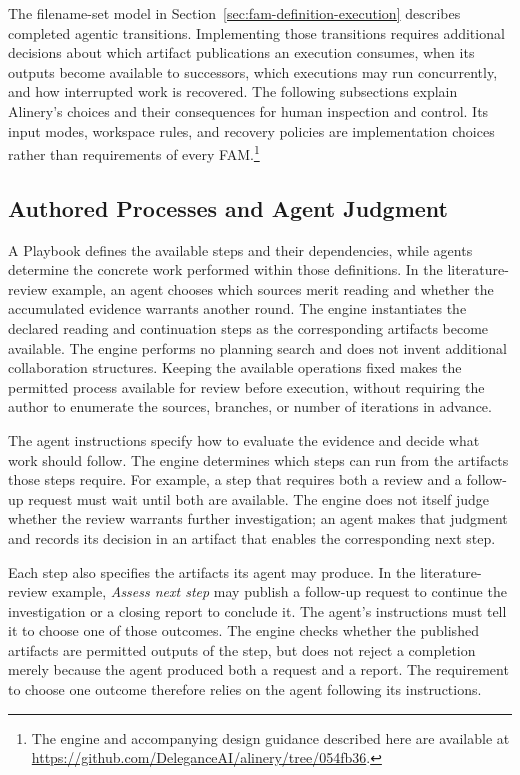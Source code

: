 \documentclass[letterpaper]{article}
\theoremstyle{definition}
\begin{document}
The filename-set model in Section~\ref{sec:fam-definition-execution}
describes completed agentic transitions. Implementing those transitions
requires additional decisions about which artifact publications an
execution consumes, when its outputs become available to successors, which
executions may run concurrently, and how interrupted work is recovered.
The following subsections explain Alinery's choices and their consequences
for human inspection and control. Its input modes, workspace rules, and
recovery policies are implementation choices rather than requirements of
every FAM.\footnote{The engine and accompanying design
guidance described here are available at \url{https://github.com/DeleganceAI/alinery/tree/054fb36}.}

\subsection{Authored Processes and Agent Judgment}

A Playbook defines the available steps and their dependencies,
while agents determine the concrete work performed within those definitions.
In the literature-review example, an agent chooses which sources merit
reading and whether the accumulated evidence warrants another round. The
engine instantiates the declared reading and continuation steps as the
corresponding artifacts become available. The engine performs no planning
search and does not invent additional collaboration structures. Keeping the
available operations fixed makes the permitted process available for review
before execution, without requiring the author to enumerate the sources,
branches, or number of iterations in advance.

The agent instructions specify how to evaluate the evidence and decide what
work should follow. The engine determines which steps can run from the
artifacts those steps require. For example, a step that requires both a
review and a follow-up request must wait until both are available. The
engine does not itself judge whether the review warrants further
investigation; an agent makes that judgment and records its decision in an
artifact that enables the corresponding next step.

Each step also specifies the artifacts its agent may produce. In the
literature-review example, \emph{Assess next step} may publish a follow-up
request to continue the investigation or a closing report to conclude it.
The agent's instructions must tell it to choose one of those outcomes. The
engine checks whether the published artifacts are permitted outputs of the
step, but does not reject a completion merely because the agent produced
both a request and a report. The requirement to choose one outcome therefore
relies on the agent following its instructions.
\end{document}
